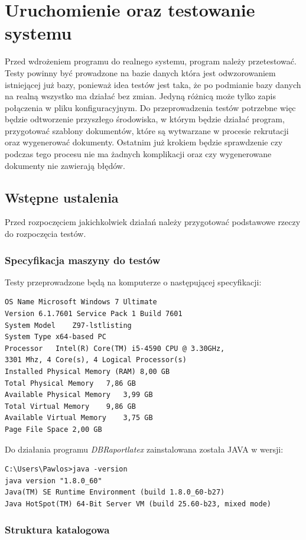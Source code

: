 \chapter{Uruchomienie oraz testowanie systemu}
Przed wdrożeniem programu do realnego systemu, program należy przetestować. Testy powinny być prowadzone na bazie danych która jest odwzorowaniem istniejącej już bazy, ponieważ idea testów jest taka, że po podmianie bazy danych na realną wszystko ma działać bez zmian. Jedyną różnicą może tylko zapis połączenia w pliku konfiguracyjnym. Do przeprowadzenia testów potrzebne więc będzie odtworzenie przyszłego środowiska, w którym będzie działać program, przygotować szablony dokumentów, które są wytwarzane w procesie rekrutacji oraz wygenerować dokumenty. Ostatnim już krokiem będzie sprawdzenie czy podczas tego procesu nie ma żadnych komplikacji oraz czy wygenerowane dokumenty nie zawierają błędów.
\section{Wstępne ustalenia}

Przed rozpoczęciem jakichkolwiek działań należy przygotować podstawowe rzeczy do rozpoczęcia testów.

\subsection{Specyfikacja maszyny do testów}
Testy przeprowadzone będą na komputerze o następującej specyfikacji:
\begin{lstlisting}
OS Name	Microsoft Windows 7 Ultimate
Version	6.1.7601 Service Pack 1 Build 7601
System Model	Z97-lstlisting
System Type	x64-based PC
Processor	Intel(R) Core(TM) i5-4590 CPU @ 3.30GHz,
3301 Mhz, 4 Core(s), 4 Logical Processor(s)
Installed Physical Memory (RAM)	8,00 GB
Total Physical Memory	7,86 GB
Available Physical Memory	3,99 GB
Total Virtual Memory	9,86 GB
Available Virtual Memory	3,75 GB
Page File Space	2,00 GB
\end{lstlisting}

Do działania programu \emph{DBRaportlatex} zainstalowana została JAVA w wersji:
\begin{lstlisting}
C:\Users\Pawlos>java -version
java version "1.8.0_60"
Java(TM) SE Runtime Environment (build 1.8.0_60-b27)
Java HotSpot(TM) 64-Bit Server VM (build 25.60-b23, mixed mode)
\end{lstlisting}

\subsection{Struktura katalogowa}

